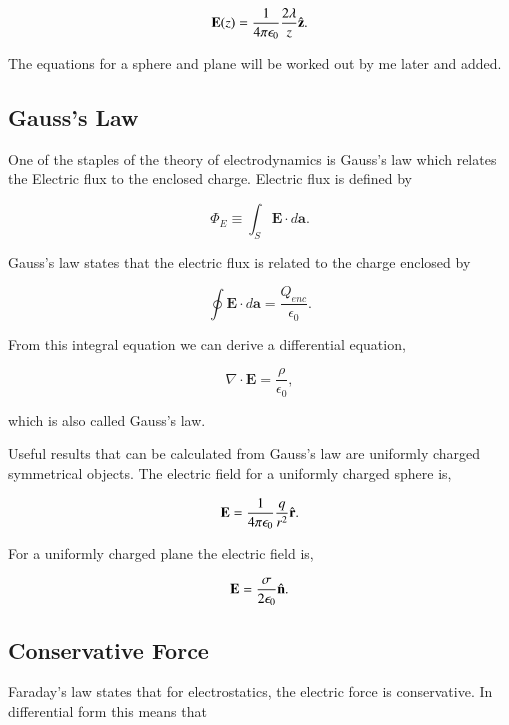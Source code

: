 \documentclass[preprint, review,12pt]{elsarticle}
\def\k{\frac{1}{4 \pi \epsilon_0}}
\def\.{\cdot}
\def\b{\textbf}
\def\={\equiv}
\def\div{\nabla \.}
\newcommand{\hb}[1]{\hat{\b #1}}
\begin{document}
\begin{equation}
    \b{E}(z) = \k \frac{2\lambda}{z} \hb{z}.
\end{equation}

The equations for a sphere and plane will be worked out by me later and added.

\subsection{Gauss's Law}

One of the staples of the theory of electrodynamics is Gauss's law which relates the Electric flux to the enclosed charge. Electric flux is defined by

\begin{equation}
    \Phi_E \= \int_S \b{E}\. d\b{a}.
\end{equation}

Gauss's law states that the electric flux is related to the charge enclosed by

\begin{equation}
    \oint \b{E}\. d\b{a} = \frac{Q_{enc}}{\epsilon_0}.
\end{equation}

From this integral equation we can derive a differential equation,

\begin{equation}
    \div \b{E} = \frac{\rho}{\epsilon_0},
\end{equation}

which is also called Gauss's law. 

Useful results that can be calculated from Gauss's law are uniformly charged symmetrical objects. The electric field for a uniformly charged sphere is,

\begin{equation}
    \b{E}= \k \frac{q}{r^2}\hb{r}.
\end{equation}

For a uniformly charged plane the electric field is,

\begin{equation}
    \b{E} = \frac{\sigma}{2\epsilon_0}\hb{n}.
\end{equation}

\subsection{Conservative Force}

Faraday's law states that for electrostatics, the electric force is conservative. In differential form this means that
\end{document}
